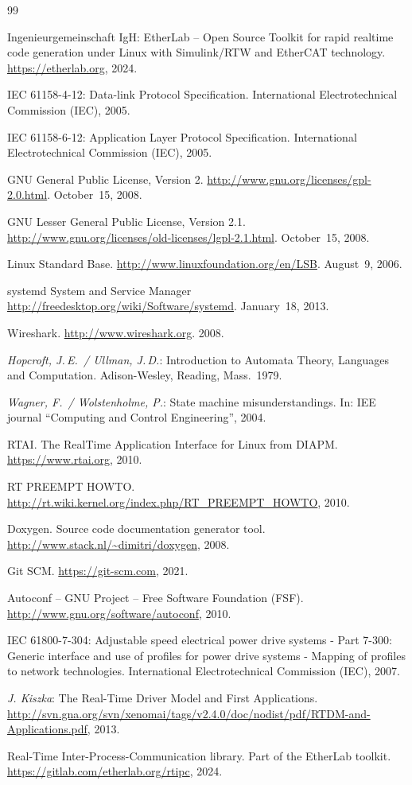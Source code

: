 \documentclass[a4paper,12pt,BCOR=6mm,bibtotoc,idxtotoc]{scrbook}
\renewcommand\nomname{Glossary}
\begin{document}
\begin{thebibliography}{99}

 Ingenieurgemeinschaft IgH: EtherLab -- Open Source Toolkit
for rapid realtime code generation under Linux with Simulink/RTW and EtherCAT
technology. \url{https://etherlab.org}, 2024.

 IEC 61158-4-12: Data-link Protocol Specification.
International Electrotechnical Commission (IEC), 2005.

 IEC 61158-6-12: Application Layer Protocol Specification.
International Electrotechnical Commission (IEC), 2005.

 GNU General Public License, Version 2.
\url{http://www.gnu.org/licenses/gpl-2.0.html}. October~15, 2008.

 GNU Lesser General Public License, Version 2.1.
\url{http://www.gnu.org/licenses/old-licenses/lgpl-2.1.html}. October~15,
2008.

 Linux Standard Base.
\url{http://www.linuxfoundation.org/en/LSB}. August~9, 2006.

 systemd System and Service Manager
\url{http://freedesktop.org/wiki/Software/systemd}. January~18, 2013.

 Wireshark. \url{http://www.wireshark.org}. 2008.

 {\it Hopcroft, J.\,E.\ / Ullman, J.\,D.}: Introduction to
Automata Theory, Languages and Computation. Adison-Wesley, Reading,
Mass.~1979.

 {\it Wagner, F.\ / Wolstenholme, P.}: State machine
misunderstandings. In: IEE journal ``Computing and Control Engineering'',
2004.

 RTAI. The RealTime Application Interface for Linux from DIAPM.
\url{https://www.rtai.org}, 2010.

 RT PREEMPT HOWTO.
\url{http://rt.wiki.kernel.org/index.php/RT_PREEMPT_HOWTO}, 2010.

 Doxygen. Source code documentation generator tool.
\url{http://www.stack.nl/~dimitri/doxygen}, 2008.

 Git SCM. \url{https://git-scm.com}, 2021.

 Autoconf -- GNU Project -- Free Software Foundation (FSF).
\url{http://www.gnu.org/software/autoconf}, 2010.

 IEC 61800-7-304: Adjustable speed electrical power drive
systems - Part 7-300: Generic interface and use of profiles for power drive
systems - Mapping of profiles to network technologies. International
Electrotechnical Commission (IEC), 2007.

 {\it J. Kiszka}: The Real-Time Driver Model and First
Applications.
\url{http://svn.gna.org/svn/xenomai/tags/v2.4.0/doc/nodist/pdf/RTDM-and-Applications.pdf},
2013.

 Real-Time Inter-Process-Communication library. Part of the
    EtherLab toolkit. \url{https://gitlab.com/etherlab.org/rtipc}, 2024.

\end{thebibliography}

\printnomenclature
\addcontentsline{toc}{chapter}{\nomname}
\markleft{\nomname}

\printindex
{}

\end{document}
